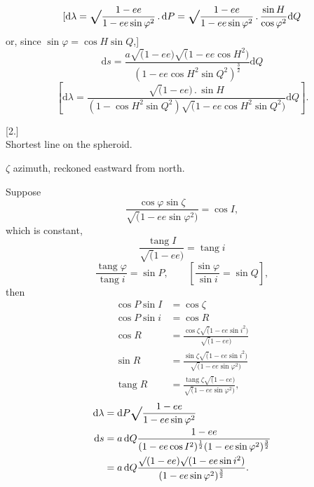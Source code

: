 \par\clearpage
\noindent{}\makebox[12mm][r]{}\par\medskip

\[
[\mathrm d\lambda=\ixrad\frac{1-ee}{1-ee\sin\varphi^2}\,.\,\mathrm dP
=\ixrad\frac{1-ee}{1-ee\sin\varphi^2}\,.\,\frac{\sin H}{\cos\varphi^2}\mathrm dQ
\]
\noindent or, since \(\sin\varphi=\cos H\sin Q\),]
\[
\mathrm ds=\frac{a\surd(1-ee)\surd(1-ee\cos H^2)}
{(1-ee\cos H^2\sin Q^2)^{\frac32}}\mathrm dQ
\]
\[
\left[\mathrm d\lambda=\frac{\surd(1-ee)\,.\,\sin H}
{(1-\cos H^2\sin Q^2)\surd(1-ee\cos H^2\sin Q^2)}\mathrm dQ\right].
\]

\bigskip
\begin{center}
[2.]\\[.5ex]
Shortest line on the spheroid.
\end{center}

\(\zeta\) azimuth, reckoned eastward from north.

Suppose
\[
\frac{\cos\varphi\sin\zeta}{\surd(1-ee\sin\varphi^2)}=\cos I,
\]
\noindent which is constant,
\[
\frac{\operatorname{tang}I}{\surd(1-ee)}=\operatorname{tang}i
\]
\[
\frac{\operatorname{tang}\varphi}{\operatorname{tang}i}=\sin P,\qquad
\left[\frac{\sin\varphi}{\sin i}=\sin Q\right],
\]
\noindent then
\[
\begin{aligned}
\cos P\sin I&=\cos\zeta\\
\cos P\sin i&=\cos R\\
\cos R&=\frac{\cos\zeta\surd(1-ee\sin i^2)}{\surd(1-ee)}\\
\sin R&=\frac{\sin\zeta\surd(1-ee\sin i^2)}{\surd(1-ee\sin\varphi^2)}\\
\operatorname{tang}R&=\frac{\operatorname{tang}\zeta\surd(1-ee)}{\surd(1-ee\sin\varphi^2)},
\end{aligned}
\]
\[
\begin{aligned}
\mathrm d\lambda&=\mathrm dP\ixrad\frac{1-ee}{1-ee\sin\varphi^2}\\
\mathrm ds&=a\,\mathrm dQ\frac{1-ee}{(1-ee\cos I^2)^{\frac12}(1-ee\sin\varphi^2)^{\frac32}}\\
&=a\,\mathrm dQ\frac{\surd(1-ee)\surd(1-ee\sin i^2)}
{(1-ee\sin\varphi^2)^{\frac32}}.
\end{aligned}
\]

\par\clearpage
\noindent\makebox[12mm][l]{}\par\medskip

